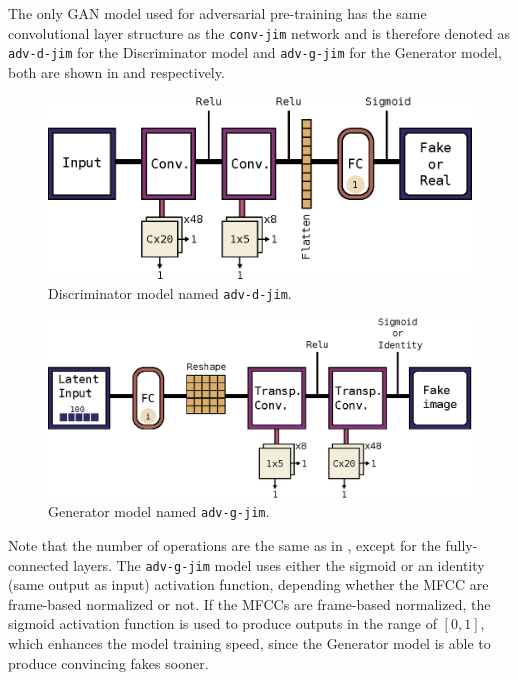 The only GAN model used for adversarial pre-training has the same convolutional layer structure as the \texttt{conv-jim} network and is therefore denoted as \texttt{adv-d-jim} for the Discriminator model and \texttt{adv-g-jim} for the Generator model, both are shown in  and  respectively.
\begin{figure}[!ht]
  \centering
    \includegraphics[height=0.2\textwidth]{./4_nn/figs/nn_arch_adv_d_jim.eps}
  \caption{Discriminator model named \texttt{adv-d-jim}.}
  \label{fig:nn_arch_adv_d_jim}
\end{figure}
\FloatBarrier
\noindent
\begin{figure}[!ht]
  \centering
    \includegraphics[height=0.23\textwidth]{./4_nn/figs/nn_arch_adv_g_jim.eps}
  \caption{Generator model named \texttt{adv-g-jim}.}
  \label{fig:nn_arch_adv_g_jim}
\end{figure}
\FloatBarrier
\noindent
Note that the number of operations are the same as in , except for the fully-connected layers.
The \texttt{adv-g-jim} model uses either the sigmoid or an identity (same output as input) activation function, depending whether the MFCC are frame-based normalized or not.
If the MFCCs are frame-based normalized, the sigmoid activation function is used to produce outputs in the range of $[0, 1]$, which enhances the model training speed, since the Generator model is able to produce convincing fakes sooner.



